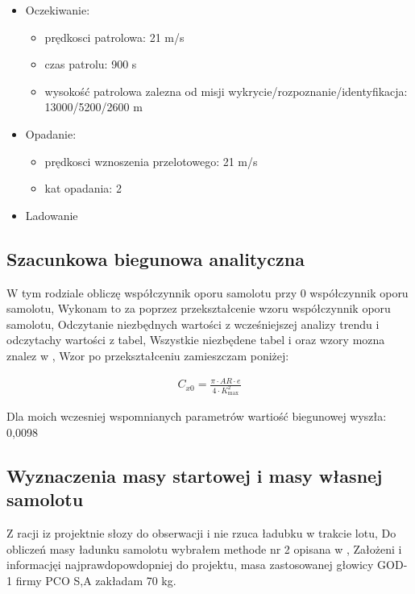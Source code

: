 \begin{itemize}
\begin{itemize}
                    \item wysokość prtzelotowa: 3000 m
                \end{itemize}
            \item Oczekiwanie: 
                \begin{itemize}
                    \item prędkosci patrolowa: 21 m/s
                    \item czas patrolu: 900 s
                    \item wysokość patrolowa zalezna od misji wykrycie/rozpoznanie/identyfikacja: 13000/5200/2600 m
                \end{itemize}
            \item Opadanie:
                \begin{itemize}
                    \item prędkosci wznoszenia przelotowego: 21 m/s 
                    \item kat opadania: 2\textdegree
                \end{itemize}
            \item Ladowanie

        \end{itemize}

    \clearpage
    \subsection{Szacunkowa biegunowa analityczna}
        
        W tym rodziale obliczę współczynnik oporu samolotu przy 0 współczynnik oporu samolotu,
        Wykonam to za poprzez przekształcenie wzoru współczynnik oporu samolotu,
        Odczytanie niezbędnych wartości z wcześniejszej analizy trendu i odczytachy wartości z tabel,
        Wszystkie niezbędene tabel i oraz wzory mozna znalez w \cite{galinski}, 
        Wzor po przekształceniu zamieszczam poniżej:

        \begin{align}
            C_{x0} = \frac{\pi \cdot AR \cdot e}{4 \cdot K_{\max}^2}
        \end{align}

        Dla moich wczesniej wspomnianych parametrów wartiość biegunowej wyszła: 0,0098

    \subsection{Wyznaczenia masy startowej i masy własnej samolotu}
        Z racji iz projektnie słozy  do obserwacji i nie rzuca ładubku w trakcie lotu,
        Do obliczeń masy ładunku samolotu wybrałem methode nr 2 opisana w \cite{galinski},
        Założeni i informacjęi najprawdopowdopniej do projektu, masa zastosowanej głowicy GOD-1 firmy PCO S,A zakładam 70 kg.
        
